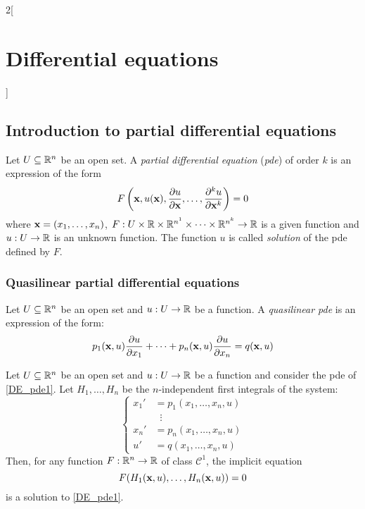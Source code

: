 \documentclass[../../../main.tex]{subfiles}
\begin{document}
\begin{multicols}{2}[\section{Differential equations}]
  \subsection{Introduction to partial differential equations}
  \begin{definition}
    Let $U\subseteq \mathbb{R}^n$ be an open set. A \emph{partial differential equation} (\emph{pde}) of order $k$ is an expression of the form $$F\left(\boldsymbol{\mathrm{x}},u(\boldsymbol{\mathrm{x}}),\pdv{u}{\boldsymbol{\mathrm{x}}},\ldots,\pdv[k]{u}{\boldsymbol{\mathrm{x}}}\right)=0$$ where $\boldsymbol{\mathrm{x}}=(x_1,\ldots,x_n)$, $F:U\times\mathbb{R}\times\mathbb{R}^{n^1}\times\cdots\times\mathbb{R}^{n^k}\rightarrow\mathbb{R}$ is a given function and $u:U\rightarrow \mathbb{R}$ is an unknown function. The function $u$ is called \emph{solution} of the pde defined by $F$.
  \end{definition}
  \subsubsection{Quasilinear partial differential equations}
  \begin{definition}
    Let $U\subseteq \mathbb{R}^n$ be an open set and $u:U\rightarrow\mathbb{R}$ be a function. A \emph{quasilinear pde} is an expression of the form:
    \begin{equation}\label{DE_pde1}
      p_1(\boldsymbol{\mathrm{x}},u)\pdv{u}{x_1}+\cdots+p_n(\boldsymbol{\mathrm{x}},u)\pdv{u}{x_n}=q(\boldsymbol{\mathrm{x}},u)
    \end{equation}
  \end{definition}
  \begin{theorem}
    Let $U\subseteq \mathbb{R}^n$ be an open set and $u:U\rightarrow\mathbb{R}$ be a function and consider the pde of \cref{DE_pde1}. Let $H_1,\ldots,H_{n}$ be the $n$-independent first integrals of the system:
    $$
      \left\{
      \begin{aligned}
        {x_1}' & =p_1(x_1,\ldots,x_n,u) \\
               & \;\;\vdots             \\
        {x_n}' & =p_n(x_1,\ldots,x_n,u) \\
        {u}'   & = q(x_1,\ldots,x_n,u)
      \end{aligned}
      \right.
    $$
    Then, for any function $F:\mathbb{R}^n\rightarrow\mathbb{R}$ of class $\mathcal{C}^1$, the implicit equation $$F(H_1(\boldsymbol{\mathrm{x}},u),\ldots,H_n(\boldsymbol{\mathrm{x}},u))=0$$ is a solution to \cref{DE_pde1}.
  \end{theorem}

\end{multicols}
\end{document}
